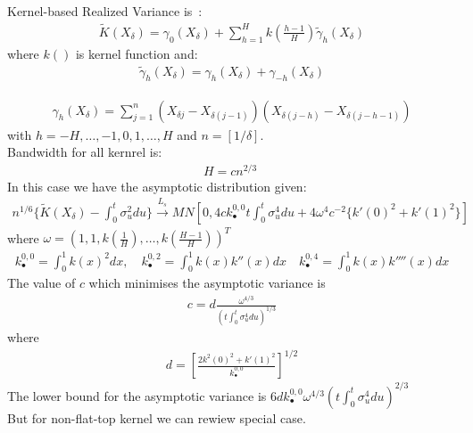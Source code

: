 \documentclass[letterpaper]{report}
\newcounter{N}
\begin{document}
Kernel-based Realized Variance is~\cite[Barndorff-Nielsen et al., 2006]{BarndorffNielsen_Hansen_Lunde_Shephard}:
\begin{gather}
\tilde{K}(X_{\delta})=\gamma_0 (X_{\delta})+ \sum_{h=1}^H k\left(\frac{h-1}{H}\right)\tilde{\gamma}_h(X_{\delta})
\end{gather}
\noindent where $k()$ is kernel function and:
\begin{gather}
\tilde{\gamma}_h (X_{\delta}) = \gamma_h (X_\delta) + \gamma_{-h}(X_{\delta})
\end{gather}

\begin{gather}
\gamma_h (X_{\delta}) = \sum_{j=1}^n (X_{\delta j} - X_{\delta (j-1)})(X_{\delta (j-h)}-X_{\delta (j-h-1)})
\end{gather}
\noindent with $h = -H, \ldots, -1,0,1, \ldots, H$ and $n = [1/\delta]$.\\

\noindent Bandwidth for all kernrel is:
\begin{gather}
H = cn^{2/3}\;
\end{gather}
\noindent In this case we have the asymptotic distribution given:
\begin{gather}
n^{1/6}\{\tilde{K}(X_{\delta}) - \int_0^t \sigma_u^2 du\}\stackrel{L_s}{\to} MN \left[0,4 ck^{0,0}_{\bullet} t \int_0^t \sigma_u^4 du + 4\omega^4 c^{-2} \{k'(0)^2 + k'(1)^2\}\right] 
\end{gather}
\noindent where $\omega = (1,1,k(\frac{1}{H}), \ldots, k\left(\frac{H-1}{H}\right))^T$
\begin{gather}
k_{\bullet}^{0,0} = \int_0^1 k(x)^2 dx, \quad k_{\bullet}^{0,2} = \int_0^1 k(x)k''(x) dx \quad k_{\bullet}^{0,4} = \int_0^1 k(x)k''''(x) dx
\end{gather}
\noindent The value of $c$ which minimises the asymptotic variance is
\begin{gather}
c = d \frac {\omega^{4/3}}{(t\int_0^t \sigma_u^4 du)^{1/3}}
\end{gather}
\noindent where
\begin{gather}
d = \left[\frac{2{k^2(0)^2+k'(1)^2}}{k_{\bullet}^{0,0}}\right]^{1/2}
\end{gather}
\noindent The lower bound for the asymptotic variance is $6 dk_{\bullet}^{0,0}
\omega^{4/3} (t \int_0^t \sigma_u^4 du)^{2/3}$\\

\noindent But for non-flat-top kernel we can rewiew special case.\\
\end{document}
